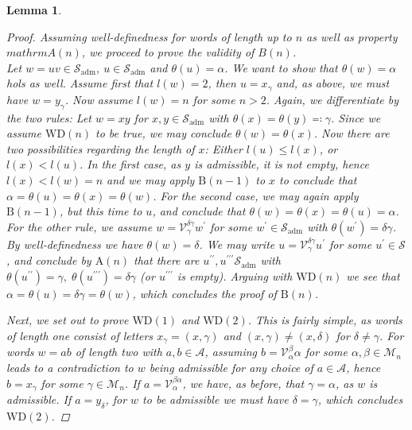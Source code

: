 \documentclass[10pt, a4paper, UKenglish]{article}
\numberwithin{equation}{section}
\newcommand{\cM}{\mathcal{M}}
\newcommand{\cS}{\mathcal{S}}
\newcommand{\cV}{\mathcal{V}}
\newcommand{\cA}{\mathcal{A}}
\newcommand{\dprime}{{\prime\prime}}
\newcommand{\tprime}{{\prime\prime\prime}}
\theoremstyle{plain}
\newtheorem{lem}[equation]{Lemma}
\theoremstyle{definition}
\begin{document}
\begin{lem}
\begin{proof}
Assuming well-definedness for words of length up to $n$ as well as property $mathrm{A}(n)$, we proceed to prove the validity of $B(n)$.\\
Let $w = uv \in \cS_{\mathrm{adm}}$, $u \in \cS_{\mathrm{adm}}$ and $\theta(u) = \alpha$. We want to show that $\theta(w) = \alpha$ hols as well. Assume first that $l(w) = 2$, then $u = x_\gamma$ and, as above, we must have $w = y_\gamma$. Now assume $l(w) = n$ for some $n > 2$. Again, we differentiate by the two rules: Let $w = xy$ for $x,y \in \cS_\mathrm{adm}$ with $\theta(x) = \theta(y) \eqqcolon \gamma$. Since we assume $\mathrm{WD}(n)$ to be true, we may conclude $\theta(w) = \theta(x)$. Now there are two possibilities regarding the length of $x$: Either $l(u) \leq l(x)$, or $l(x) < l(u)$. In the first case, as $y$ is admissible, it is not empty, hence $l(x) < l(w) = n$ and we may apply $\mathrm{B}(n-1)$ to $x$ to conclude that $\alpha = \theta(u) = \theta(x) = \theta(w)$. For the second case, we may again apply $\mathrm{B}(n-1)$, but this time to $u$, and conclude that $\theta(w) = \theta(x) = \theta(u) = \alpha$. For the other rule, we assume $w = \cV_\gamma^{\delta\gamma} w^\prime$ for some $w^\prime \in \cS_{\mathrm{adm}}$ with $\theta(w^\prime) = \delta\gamma$. By well-definedness we have $\theta(w) = \delta$. We may write $u = \cV_\gamma^{\delta\gamma} u^\prime$ for some $u^\prime \in \cS$, and conclude by $\mathrm{A}(n)$ that there are $u^{\dprime},u^{\tprime}\cS_{\mathrm{adm}}$ with $\theta(u^{\dprime}) = \gamma, \; \theta(u^{\tprime}) = \delta\gamma$ (or $u^{\tprime}$ is empty). Arguing with $\mathrm{WD}(n)$ we see that $\alpha = \theta(u) = \delta\gamma = \theta(w)$, which concludes the proof of $\mathrm{B}(n)$.

Next, we set out to prove $\mathrm{WD}(1)$ and $\mathrm{WD}(2)$. This is fairly simple, as words of length one consist of letters $x_\gamma = (x,\gamma)$ and $(x,\gamma) \neq (x,\delta)$ for $\delta \neq \gamma$. For words $w = ab$ of length two with $a,b \in \cA$, assuming $b=\cV_\alpha^\beta\alpha$ for some $\alpha,\beta \in \cM_n$ leads to a contradiction to $w$ being admissible for any choice of $a \in \cA$, hence $b = x_\gamma$ for some $\gamma \in \cM_n$. If $a = \cV_\alpha^{\beta\alpha}$, we have, as before, that $\gamma = \alpha$, as $w$ is admissible. If $a = y_\delta$, for $w$ to be admissible we must have $\delta = \gamma$, which concludes $\mathrm{WD(2)}$.


\end{proof}
\end{lem}
\end{document}

